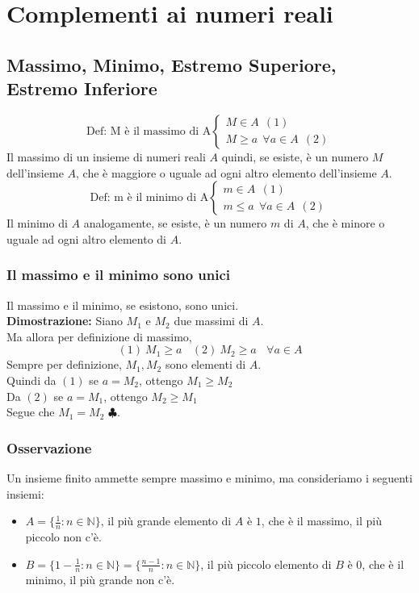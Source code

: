 \documentclass[../../main.tex]{subfiles}
\begin{document}
\section{Complementi ai numeri reali}
\subsection{Massimo, Minimo, Estremo Superiore, Estremo Inferiore}
\[
    \text{Def: M è il massimo di A} \begin{cases}
        M \in A  \ \ (1) \\
        M \geq a \ \ \forall a \in A \ \ (2)
    \end{cases}
\]
Il massimo di un insieme di numeri reali $A$ quindi, se esiste, è un numero $M$
dell'insieme $A$, che è maggiore o uguale ad ogni altro elemento dell'insieme
$A$.
\[
    \text{Def: m è il minimo di A} \begin{cases}
        m \in A  \ \ (1) \\
        m \leq a \ \ \forall a \in A \ \ (2)
    \end{cases}
\]
Il minimo di $A$ analogamente, se esiste, è un numero $m$ di $A$, che è minore
o uguale ad ogni altro elemento di $A$.

\subsubsection{Il massimo e il minimo sono unici}
Il massimo e il minimo, se esistono, sono unici.\\ \textbf{Dimostrazione:}
Siano $M_1$ e $M_2$ due massimi di $A$.\\ Ma allora per definizione di massimo,
\[
    (1) \ M_1 \geq a \ \ \ \ (2) \ M_2 \geq a \ \ \ \ \forall a \in A
\]
Sempre per definizione, $M_1, M_2$ sono elementi di $A$.\\ Quindi da $(1)$ se
$a = M_2$, ottengo $M_1 \geq M_2$\\ Da $(2)$ se $a = M_1$, ottengo $M_2 \geq
    M_1$\\ Segue che $M_1 = M_2$ $\clubsuit$.

\subsubsection{Osservazione}
Un insieme finito ammette sempre massimo e minimo, ma consideriamo i seguenti
insiemi:
\begin{itemize}
    \item $A = \{\frac{1}{n} : n\in \mathbb{N}\}$, il più grande elemento di $A$ è $1$, che è il massimo, il più piccolo non c'è.
    \item $B = \{1-\frac{1}{n} : n\in\mathbb{N}\} = \{\frac{n-1}{n} : n\in\mathbb{N}\}$, il più piccolo elemento di $B$ è $0$, che è il minimo, il più grande non c'è.
\end{itemize}
\end{document}
